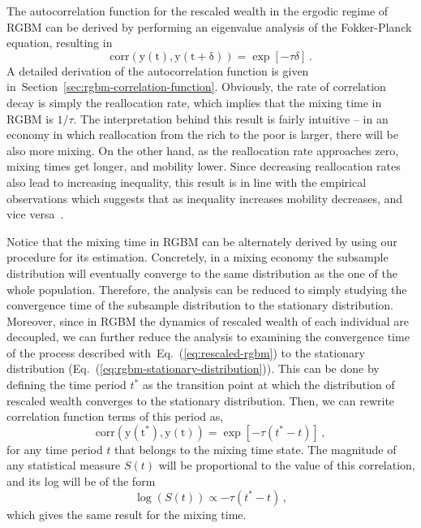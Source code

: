 \documentclass[11pt]{article}
\newcommand{\eref}[1]{Eq.~(\ref{eq:#1})}
\newcommand{\Sref}[1]{Section~\ref{sec:#1}}
\newcommand{\Fref}[1]{Figure~\ref{fig:#1}}
\newcommand{\be}{\begin{equation}}
\newcommand{\ee}{\end{equation}}
\numberwithin{equation}{section}
\begin{document}
The autocorrelation function for the rescaled wealth in the ergodic regime of RGBM can be derived by performing an eigenvalue analysis of the Fokker-Planck equation, resulting in
\be
\mathrm{corr(y(t), y(t+\delta))} = \exp\left[ -\tau \delta \right]\,.
\label{eq:rgbm-correlation}
\ee
%
A detailed derivation of the autocorrelation function is given in~\Sref{rgbm-correlation-function}. Obviously, the rate of correlation decay is simply the reallocation rate, which implies that the mixing time in RGBM is $1/\tau$. The interpretation behind this result is fairly intuitive -- in an economy in which reallocation from the rich to the poor is larger, there will be also more mixing. On the other hand, as the reallocation rate approaches zero, mixing times get longer, and mobility lower. Since decreasing reallocation rates also lead to increasing inequality, this result is in line with the empirical observations which suggests that as inequality increases mobility decreases, and vice versa~\citep{corak2013}.

Notice that the mixing time in RGBM can be alternately derived by using our procedure for its estimation. Concretely, in a mixing economy the subsample distribution will eventually converge to the same distribution as the one of the whole population. Therefore, the analysis can be reduced to simply studying the convergence time of the subsample distribution to the stationary distribution. Moreover, since in RGBM the dynamics of rescaled wealth of each individual are decoupled, we can further reduce the analysis to examining the convergence time of the process described with~\eref{rescaled-rgbm} to the stationary distribution (\eref{rgbm-stationary-distribution}).
This can be done by defining the time period $t^*$ as the transition point at which the distribution of rescaled wealth converges to the stationary distribution. Then, we can rewrite correlation function terms of this period as,
%
\be
    \mathrm{corr(y(t^*), y(t))} = \exp\left[ -\tau (t^* -t)\right]\,,
\ee
%
for any time period $t$ that belongs to the mixing time state. The magnitude of any statistical measure $S(t)$ will be proportional to the value of this correlation, and its log will be of the form
%
\be
    \log (S(t)) \propto  - \tau (t^*-t)\,,
\ee
%
which gives the same result for the mixing time.%
\end{document}
